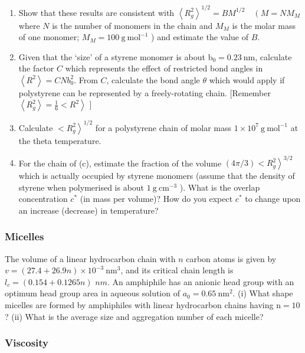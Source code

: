 \documentclass[
  letterpaper,
  DIV=11,
  numbers=noendperiod]{scrartcl}
\providecommand{\tightlist}{%
  \setlength{\itemsep}{0pt}\setlength{\parskip}{0pt}}\usepackage{longtable,booktabs,array}
\begin{document}
\begin{enumerate}
\def\labelenumi{(\alph{enumi})}
\tightlist
\item
  Show that these results are consistent with
  \(\left\langle R_{g}^{2}\right\rangle^{1 / 2}=B M^{1 / 2} \quad\left(M=N M_{M}\right.\)
  where \(N\) is the number of monomers in the chain and \(M_{M}\) is
  the molar mass of one monomer;
  \(M_{M}=100 \mathrm{~g} \mathrm{~mol}^{-1}\) ) and estimate the value
  of \(B\).
\item
  Given that the `size' of a styrene monomer is about
  \(\mathrm{b}_{0}=0.23 \mathrm{~nm}\), calculate the factor \(C\) which
  represents the effect of restricted bond angles in
  \(\left\langle R^{2}\right\rangle=C N b_{0}^{2}\). From \(C\),
  calculate the bond angle \(\theta\) which would apply if polystyrene
  can be represented by a freely-rotating chain. {[}Remember
  \(\left.\left\langle R_{g}^{2}\right\rangle=\frac{1}{6}<R^{2}\right\rangle\)
  {]}
\item
  Calculate \(\left.<R_{g}^{2}\right\rangle^{1 / 2}\) for a polystyrene
  chain of molar mass \(1 \times 10^{7} \mathrm{~g} \mathrm{~mol}^{-1}\)
  at the theta temperature.
\item
  For the chain of (c), estimate the fraction of the volume
  \(\left.(4 \pi / 3)<R_{g}^{2}\right\rangle^{3 / 2}\) which is actually
  occupied by styrene monomers (assume that the density of styrene when
  polymerised is about \(1 \mathrm{~g} \mathrm{~cm}^{-3}\) ). What is
  the overlap concentration \(c^{*}\) (in mass per volume)? How do you
  expect \(c^{*}\) to change upon an increase (decrease) in temperature?
\end{enumerate}

\subsubsection{Micelles}\label{micelles}

The volume of a linear hydrocarbon chain with \(n\) carbon atoms is
given by \(v=(27.4+26.9 n) \times 10^{-3} \mathrm{~nm}^{3}\), and its
critical chain length is \(l_{c}=(0.154+0.1265 n)\) \(n m\). An
amphiphile has an anionic head group with an optimum head group area in
aqueous solution of \(a_{0}=0.65 \mathrm{~nm}^{2}\). (i) What shape
micelles are formed by amphiphiles with linear hydrocarbon chains having
\(\mathrm{n}=10\) ? (ii) What is the average size and aggregation number
of each micelle?

\subsubsection{Viscosity}\label{viscosity}
\end{document}
